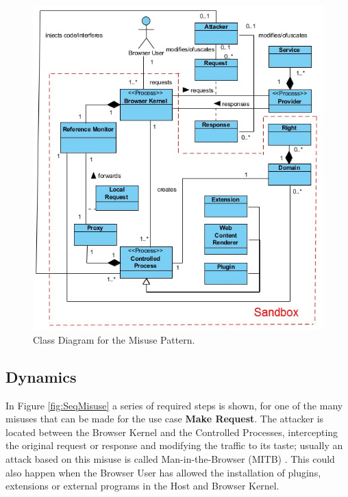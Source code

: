 \documentclass{sig-alternate-05-2015}
\begin{document}
\begin{figure}[h!t]
  \centering
  \includegraphics[scale=0.8]{figures/patronMisuse_v8.jpg}
  \caption{Class Diagram for the Misuse Pattern.}
  \label{fig:BIMisuse}
\end{figure}

\subsection*{Dynamics}
In Figure \ref{fig:SeqMisuse} a series of required steps is shown, for one of the many misuses that can be made for the use case \textbf{Make Request}. The attacker is located between the Browser Kernel and the Controlled Processes, intercepting the original request or response and modifying the traffic to its taste; usually an attack based on this misuse is called Man-in-the-Browser (MITB) \cite{Liu2012, Barth2010, Utakrit2009, Dougan2012}. This could also happen when the Browser User has allowed the installation of plugins, extensions or external programs in the Host and Browser Kernel.
\end{document}
